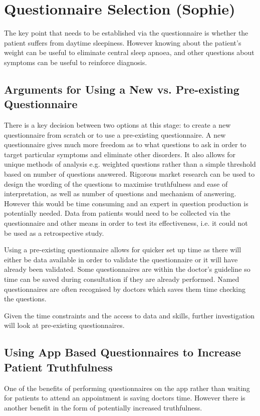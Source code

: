 \section{Questionnaire Selection (Sophie)}
\label{sec:questionnaire-sophie}
The key point that needs to be established via the questionnaire is whether the patient suffers from daytime sleepiness. However knowing about the patient’s weight can be useful to eliminate central sleep apnoea, and other questions about symptoms can be useful to reinforce diagnosis. 

\subsection{Arguments for Using a New vs. Pre-existing Questionnaire}
 There is a key decision between two options at this stage: to create a new questionnaire from scratch or to use a pre-existing questionnaire. A new questionnaire gives much more freedom as to what questions to ask in order to target particular symptoms and eliminate other disorders. It also allows for unique methods of analysis e.g. weighted questions rather than a simple threshold based on number of questions answered. Rigorous market research can be used to design the wording of the questions to maximise truthfulness and ease of interpretation, as well as number of questions and mechanism of answering. However this would be time consuming and an expert in question production is potentially needed. Data from patients would need to be collected via the questionnaire and other means in order to test its effectiveness, i.e. it could not be used as a retrospective study.

Using a pre-existing questionnaire allows for quicker set up time as there will either be data available in order to validate the questionnaire or it will have already been validated. Some questionnaires are within the doctor’s guideline so time can be saved during consultation if they are already performed. Named questionnaires are often recognised by doctors which saves them time checking the questions.

Given the time constraints and the access to data and skills, further investigation will look at pre-existing questionnaires. 

\subsection{Using App Based Questionnaires to Increase Patient Truthfulness}
One of the benefits of performing questionnaires on the app rather than waiting for patients to attend an appointment is saving doctors time. However there is another benefit in the form of potentially increased truthfulness. 

